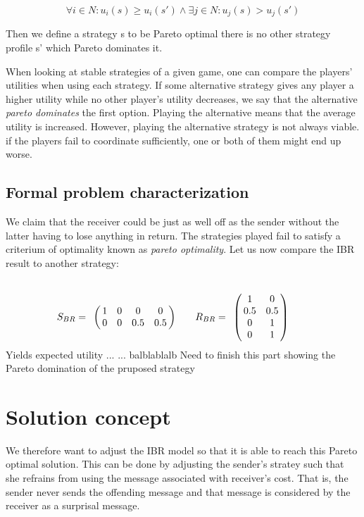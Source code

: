 \documentclass[10]{article}
\begin{document}
\begin{equation*}
\forall i \in N: u_i(s) \geq u_i(s') \land \exists j \in N: u_j(s) > u_j(s')
\end{equation*}

Then we define a strategy s to be Pareto optimal there is no other strategy profile s' which Pareto dominates it. %


When looking at stable strategies of a given game, one can compare the players' utilities when using each strategy. If some alternative strategy gives any player a higher utility while no other player's utility decreases, we say that the alternative \textit{pareto dominates} the first option. Playing the alternative means that the average utility is increased. However, playing the alternative strategy is not always viable. if the players fail to coordinate sufficiently, one or both of them might end up worse.
\subsection{Formal problem characterization}
We claim that the receiver could be just as well off as the sender without the latter having to lose anything in return. The strategies played fail to satisfy a criterium of optimality known as \textit{pareto optimality}. Let us now compare the IBR result to another strategy:

\begin{equation*}
S_{BR}=
\bordermatrix{
            & & & &    \cr
 &       1 &         0 & 0       & 0 \cr
 &       0 &         0 & 0.5      & 0.5
 }\qquad
R_{BR}=
\bordermatrix{
            &  & \cr
    & 1 & 0 \cr
     & 0.5 & 0.5 \cr
     & 0 & 1 \cr
     & 0 & 1 \cr
 }\qquad
\end{equation*}
Yields expected utility ...
... balblablalb
Need to finish this part showing the Pareto domination of the pruposed strategy

\section{Solution concept}
We therefore want to adjust the IBR model so that it is able to reach this Pareto optimal solution. This can be done by adjusting the sender's stratey such that she refrains from using the message associated with receiver's cost. That is, the sender never sends the offending message and that message is considered by the receiver as a surprisal message.
\end{document}
